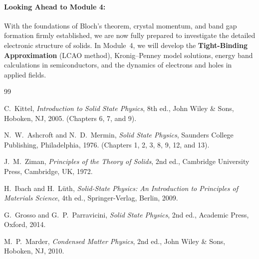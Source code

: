 \documentclass[11pt,a4paper]{article}
\begin{document}
\paragraph{Looking Ahead to Module 4:}
With the foundations of Bloch's theorem, crystal momentum, and band gap formation firmly established, we are now fully prepared to investigate the detailed electronic structure of solids. In Module~4, we will develop the \textbf{Tight-Binding Approximation} (LCAO method), Kronig--Penney model solutions, energy band calculations in semiconductors, and the dynamics of electrons and holes in applied fields.

\clearpage

\begin{thebibliography}{99}

C.~Kittel, \emph{Introduction to Solid State Physics}, 8th ed., John Wiley \& Sons, Hoboken, NJ, 2005. (Chapters 6, 7, and 9).

N.~W.~Ashcroft and N.~D.~Mermin, \emph{Solid State Physics}, Saunders College Publishing, Philadelphia, 1976. (Chapters 1, 2, 3, 8, 9, 12, and 13).

J.~M.~Ziman, \emph{Principles of the Theory of Solids}, 2nd ed., Cambridge University Press, Cambridge, UK, 1972.

H.~Ibach and H.~Lüth, \emph{Solid-State Physics: An Introduction to Principles of Materials Science}, 4th ed., Springer-Verlag, Berlin, 2009.

G.~Grosso and G.~P.~Parravicini, \emph{Solid State Physics}, 2nd ed., Academic Press, Oxford, 2014.

M.~P.~Marder, \emph{Condensed Matter Physics}, 2nd ed., John Wiley \& Sons, Hoboken, NJ, 2010.

\end{thebibliography}
\end{document}
